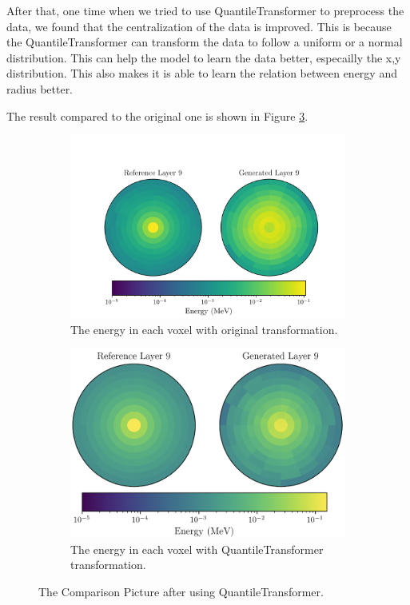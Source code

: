 After that, one time when we tried to use QuantileTransformer to preprocess the data, we found that the centralization of the data is improved. This is because the QuantileTransformer can transform the data to follow a uniform or a normal distribution. This can help the model to learn the data better, especailly the x,y distribution. This also makes it is able to learn the relation between energy and radius better.

The result compared to the original one is shown in Figure \ref{fig:centralization}.

\begin{figure}[htbp]
    \centering
    \begin{subfigure}[b]{0.5\textwidth} %
        \includegraphics[width=\textwidth]{Figures/comparison_original.png}
        \caption{The energy in each voxel with original transformation.}
        \label{fig:original}
    \end{subfigure}
    \hfill %
    \begin{subfigure}[b]{0.4\textwidth}
        \includegraphics[width=\textwidth]{Figures/comparison.png}
        \caption{The energy in each voxel with QuantileTransformer transformation.}
        \label{fig:quantile}
    \end{subfigure}
    
    \caption{The Comparison Picture after using QuantileTransformer.}
    \label{fig:centralization}
\end{figure}

